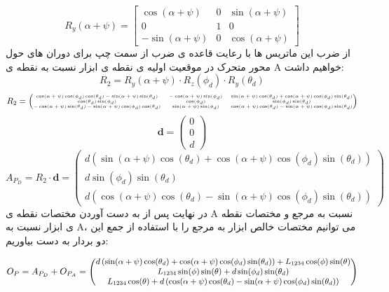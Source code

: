 \[
R_y(\alpha + \psi) = \begin{bmatrix}
	\cos(\alpha + \psi) & 0 & \sin(\alpha + \psi) \\
	0 & 1 & 0 \\
	-\sin(\alpha + \psi) & 0 & \cos(\alpha + \psi)
\end{bmatrix}
\]
از ضرب این ماتریس ها با رعایت قاعده ی ضرب از سمت چپ برای دوران های حول محور متحرک در موقعیت اولیه ی نقطه ی ابزار نسبت به نقطه ی A خواهیم داشت:
\[
R_2 = R_y(\alpha + \psi) \cdot R_z(\phi_d) \cdot R_y(\theta_d)
\]
\[
\tiny
R_2 = 
\begin{pmatrix}
	\cos(\alpha + \psi) \cos(\phi_d) \cos(\theta_d) - \sin(\alpha + \psi) \sin(\theta_d) & -\cos(\alpha + \psi) \sin(\phi_d) & \sin(\alpha + \psi) \cos(\theta_d) + \cos(\alpha + \psi) \cos(\phi_d) \sin(\theta_d) \\
	\cos(\theta_d) \sin(\phi_d) & \cos(\phi_d) & \sin(\phi_d) \sin(\theta_d) \\
	-\cos(\alpha + \psi) \sin(\theta_d) - \sin(\alpha + \psi) \cos(\phi_d) \cos(\theta_d) & \sin(\alpha + \psi) \sin(\phi_d) & \cos(\alpha + \psi) \cos(\theta_d) - \sin(\alpha + \psi) \cos(\phi_d) \sin(\theta_d)
\end{pmatrix}
\]
\[
\textbf{d} = 
\begin{pmatrix}
	0 \\
	0 \\
	d
\end{pmatrix}
\]
\[
A_{P_D} = R_2 \cdot \textbf{d} = 
\begin{pmatrix}
	d \left(\sin(\alpha + \psi) \cos(\theta_d) + \cos(\alpha + \psi) \cos(\phi_d) \sin(\theta_d)\right) \\
	d \sin(\phi_d) \sin(\theta_d) \\
	d \left(\cos(\alpha + \psi) \cos(\theta_d) - \sin(\alpha + \psi) \cos(\phi_d) \sin(\theta_d)\right)
\end{pmatrix}
\]
در نهایت پس از به دست آوردن مختصات نقطه ی A نسبت به مرجع و مختصات نقطه ی ابزار نسبت به A، می توانیم مختصات خالص ابزار به مرجع را با استفاده از جمع این دو بردار به دست بیاوریم:

\[
\small
O_P = A_{P_D} + O_{P_A} = 
\begin{pmatrix}
	d \left(\sin(\alpha + \psi) \cos(\theta_d) + \cos(\alpha + \psi) \cos(\phi_d) \sin(\theta_d)\right) + L_{1234} \cos(\phi) \sin(\theta) \\
	L_{1234} \sin(\phi) \sin(\theta) + d \sin(\phi_d) \sin(\theta_d) \\
	L_{1234} \cos(\theta) + d \left(\cos(\alpha + \psi) \cos(\theta_d) - \sin(\alpha + \psi) \cos(\phi_d) \sin(\theta_d)\right)
\end{pmatrix}
\]

